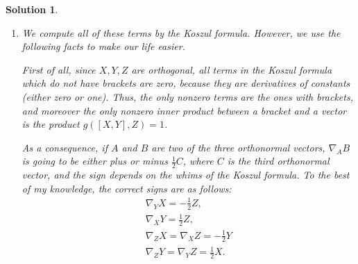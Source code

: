 \documentclass{article}
\theoremstyle{plain}
\theoremstyle{nonumberplain}
\newtheorem{sol}{Solution}
\begin{document}
\begin{sol}
\begin{enumerate}
To compute $X,Y,Z$ in coordinates has already been done.

\item We compute all of these terms by the Koszul formula. However, we use the following facts to make our life easier.

First of all, since $X,Y,Z$ are orthogonal, all terms in the Koszul formula which do not have brackets are zero, because they are derivatives of constants (either zero or one). Thus, the only nonzero terms are the ones with brackets, and moreover the only nonzero inner product between a bracket and a vector is the product $g([X,Y],Z) = 1$.

As a consequence, if $A$ and $B$ are two of the three orthonormal vectors, $\nabla_A B$ is going to be either plus or minus $\frac12 C$, where $C$ is the third orthonormal vector, and the sign depends on the whims of the Koszul formula. To the best of my knowledge, the correct signs are as follows:
\begin{equation}
\begin{gathered}
\nabla_Y X = - \frac12 Z,\\
\nabla_X Y = \frac12 Z,\\
\nabla_Z X = \nabla_X Z = - \frac12 Y\\
\nabla_Z Y = \nabla_Y Z = \frac12 X.
\end{gathered}
\end{equation}

\end{enumerate}
\end{sol}
\end{document}
